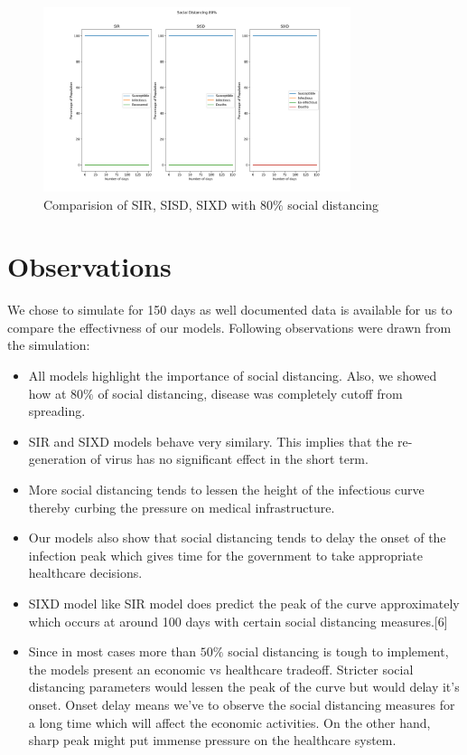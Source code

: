 \documentclass{article}
\begin{document}
	\clearpage
	\begin{figure}[h!]
		\centering
		\includegraphics[width=90mm]{images/SIR/social_distance_80.png}
		\caption{Comparision of SIR, SISD, SIXD with $80\%$ social distancing}
	\end{figure}


	\section{Observations}
	We chose to simulate for 150 days as well documented data is available for us to compare the effectivness of our models. Following observations were drawn from the simulation:
	\begin{itemize}
		\item All models highlight the importance of social distancing. Also, we showed how at $80\%$ of social distancing, disease was completely cutoff from spreading. 
		\item SIR and SIXD models behave very similary. This implies that the re-generation of virus has no significant effect in the short term.
		\item More social distancing tends to lessen the height of the infectious curve thereby curbing the pressure on medical infrastructure.
		\item Our models also show that social distancing tends to delay the onset of the infection peak which gives time for the government to take appropriate healthcare decisions.
		\item SIXD model like SIR model does predict the peak of the curve approximately which occurs at around 100 days with certain social distancing measures.[6]
		\item Since in most cases more than $50\%$ social distancing is tough to implement, the models present an economic vs healthcare tradeoff. Stricter social distancing parameters would lessen the peak of the curve but would delay it's onset. Onset delay means we've to observe the social distancing measures for a long time which will affect the economic activities. On the other hand, sharp peak might put immense pressure on the healthcare system.
	\end{itemize}
\end{document}
